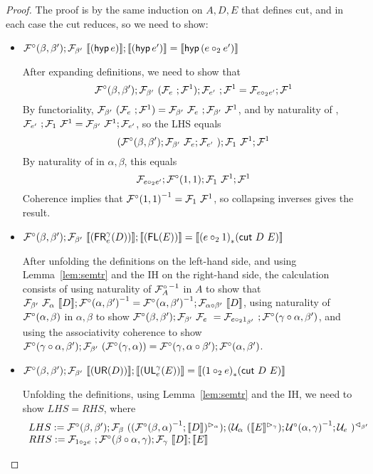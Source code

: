 \documentclass{drl-common/llncs}
\renewcommand{\sem}[1]{\ensuremath{ \llbracket #1 \rrbracket}}
\newcommand{\inv}[1]{\ensuremath{{#1}^{-1}}}
\newcommand\compo[2]{\ensuremath{#1 \circ #2}}
\newcommand\comph[2]{\ensuremath{#1 \mathbin{\circ_2} #2}}
\newcommand\tr[2]{\ensuremath{{{#1}_{*}(#2)}}}
\newcommand\cutsym{\ensuremath{\dsd{cut}}}
\newcommand\cut[2]{\ensuremath{{\cutsym \,\, #1 \,\, #2}}}
\newcommand\hyp[1]{\ensuremath{\dsd{hyp} \, {#1}}}
\newcommand\UL[3]{\ensuremath{\dsd{UL}^{#1}_{#2}(#3)}}
\newcommand\FR[3]{\ensuremath{\dsd{FR}^{#1}_{#2}(#3)}}
\newcommand\FL[1]{\ensuremath{\dsd{FL}(#1)}}
\newcommand\UR[1]{\ensuremath{\dsd{UR}(#1)}}
\begin{document}
\begin{proof}

The proof is by the same induction on $A,D,E$ that defines cut, and in
each case the cut reduces, so we need to show:

\begin{itemize}
\item $\semofcut {(\hyp e)} {(\hyp {e'})} = \sem{\hyp {(\comph{e}{e'})}}$

After expanding definitions, we need to show that
\[
\semFcomp(\beta,\beta');\semF{\beta'}{(\semF{e};\semFone)};\semF{e'};\semFone = \semFo{\comph{e}{e'}};\semFone
\]
By functoriality, $\mathcal{F}_{\beta'} \,\, (\mathcal{F}_{e} \,\, ;{\mathcal{F}^1}) =
\mathcal{F}_{\beta'} \,\, \mathcal{F}_{e} \,\, ;\mathcal{F}_{\beta'} \,\, {\mathcal{F}^1}$, and by naturality of
, $\mathcal{F}_{e'} \,\, ;{\mathcal{F}_{1} \,\, {\mathcal{F}^1}} =
\mathcal{F}_{\beta'} \,\, {\mathcal{F}^1};{\mathcal{F}_{e'}}$,
so the LHS equals
\[
(\mathcal{F}^\circ(\beta,\beta');\mathcal{F}_{\beta'} \,\, {\mathcal{F}_{e}};\mathcal{F}_{e'} \,\, );{\mathcal{F}_{1} \,\, {\mathcal{F}^1}};{\mathcal{F}^1}
\]
By naturality of \semFcomp in $\alpha,\beta$, this equals
\[
\semFo{\comph{e}{e'}};\semFcomp(1,1);{\semF{1}{\semFone}};\semFone
\]
Coherence implies that $\inv{\semFcomp(1,1)} = \semF{1}{\semFone}$, so
collapsing inverses gives the result.  

\item $\semofcut {(\FR \gamma e D)} {(\FL E)} = \sem{ \tr {(\comph{e}{1})} {\cut D E} }$

After unfolding the definitions on the left-hand side, and using
Lemma~\ref{lem:semtr} and the IH on the right-hand side, 
the calculation consists of using naturality of $\inv{\semFcomp_A}$ in $A$ to
show that $\semF{\beta'}{\semF{\alpha}{\sem
    D}};\inv{\semFcomp(\alpha,\beta')} =
\inv{\semFcomp(\alpha,\beta')};\semF{\compo \alpha \beta'}{\sem{D}}$,
using naturality of $\mathcal{F}^\circ(\alpha,\beta)$ in $\alpha,\beta$ to
show 
$\semFcomp(\beta,\beta');\semF{\beta'}{\semF{e}} =
\semF{\comph{e}{1_{\beta'}}};\semFcomp(\compo{\gamma}{\alpha},\beta')$, 
and using the associativity coherence to show
$\semFcomp(\compo{\gamma}{\alpha},\beta');\semF{\beta'}{(\semFcomp(\gamma,\alpha))}
= \semFcomp(\gamma,\compo{\alpha}{\beta'});\semFcomp(\alpha,\beta')$.

\item $\semofcut {(\UR D)} {(\UL \gamma e E)} = \sem{\tr {(\comph{1}{e})} {\cut D E}}$

Unfolding the definitions, using Lemma~\ref{lem:semtr} and the IH, we
need to show $LHS = RHS$, where
\[
\begin{array}{l}
LHS := \semFcomp(\beta,\beta');\semF{\beta}{(\semltor{(\inv{\semFcomp(\beta,\alpha)};\sem{D})}{\alpha}  )};
\semrtol{(\semU{\alpha}{(\semltor{\sem{E}}{\gamma})};\inv{\semUcomp(\alpha,\gamma)};\semU{e})}{\beta'}\\
RHS := \semF{\comph{1}{e}};\semFcomp(\compo{\beta}{\alpha},\gamma);\semF{\gamma}{\sem{D}};\sem{E}
\end{array}
\]


\end{itemize}
\end{proof}
\end{document}
